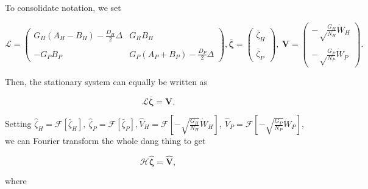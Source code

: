 \documentclass{article}
\begin{document}
To consolidate notation, we set

\begin{subequations}
  \begin{equation}
    \pmb{\mathscr{L}} = \left(\begin{matrix}
      G_H(A_H-B_H)-\frac{D_H}{2}\Delta & G_HB_H \\ & \\
      -G_PB_P & G_P(A_P+B_P)-\frac{D_P}{2}\Delta
    \end{matrix}\right),
  \end{equation}
  \begin{equation}
    \bar{\pmb{\zeta}} = \left(\begin{matrix}
      \bar\zeta_H \\ \\ \bar\zeta_P
    \end{matrix}\right), \ 
    \pmb{V} = \left(\begin{matrix}
      -\sqrt\frac{G_H}{N_H}\dot W_H \\ \\ 
      -\sqrt\frac{G_P}{N_P}\dot W_P
    \end{matrix}\right).
  \end{equation}
\end{subequations}

Then, the stationary system can equally be written as

\begin{equation}
  \pmb{\mathscr{L}}\bar{\pmb\zeta}=\pmb V.
\end{equation}

Setting
\(\hat\zeta_H=\mathcal{F}[\bar\zeta_H], \ \hat\zeta_P=\mathcal{F}[\bar\zeta_P], \hat V_H=\mathcal{F}[-\sqrt{\frac{G_H}{N_H}}\dot W_H], \ \hat V_P=\mathcal{F}[-\sqrt{\frac{G_P}{N_P}}\dot W_P]\),
we can Fourier transform the whole dang thing to get

\begin{equation}
  \pmb{\mathcal{H}}\hat{\pmb\zeta}=\hat{\pmb V},
\end{equation}

where
\end{document}
